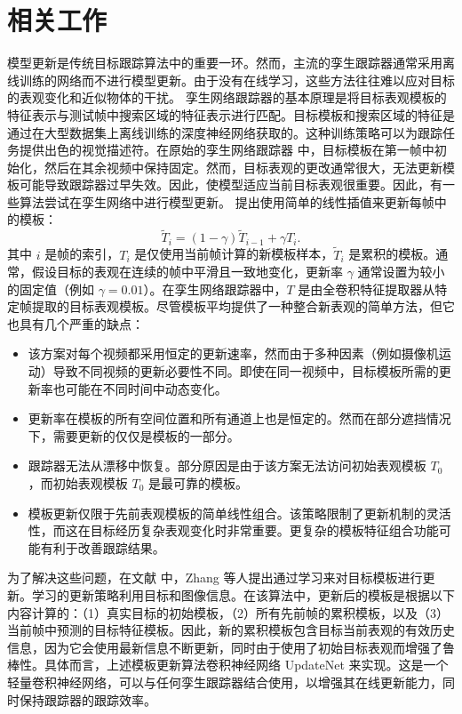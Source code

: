 \section{相关工作}
模型更新是传统目标跟踪算法中的重要一环。然而，主流的孪生跟踪器通常采用离线训练的网络而不进行模型更新。由于没有在线学习，这些方法往往难以应对目标的表观变化和近似物体的干扰。
孪生网络跟踪器的基本原理是将目标表观模板的特征表示与测试帧中搜索区域的特征表示进行匹配。目标模板和搜索区域的特征是通过在大型数据集上离线训练的深度神经网络获取的。这种训练策略可以为跟踪任务提供出色的视觉描述符。在原始的孪生网络跟踪器 \cite{SiamFC} 中，目标模板在第一帧中初始化，然后在其余视频中保持固定。然而，目标表观的更改通常很大，无法更新模板可能导致跟踪器过早失效。因此，使模型适应当前目标表观很重要。因此，有一些算法尝试在孪生网络中进行模型更新。\cite{zhu2018distractor} 提出使用简单的线性插值来更新每帧中的模板：
\begin{equation}
\widetilde{T}_{i}=(1-\gamma) \widetilde{T}_{i-1}+\gamma T_{i}.
\end{equation}
其中 $i$ 是帧的索引，$T_{i}$ 是仅使用当前帧计算的新模板样本，$\widetilde{T}_{i}$ 是累积的模板。通常，假设目标的表观在连续的帧中平滑且一致地变化，更新率 $\gamma$ 通常设置为较小的固定值（例如 $\gamma = 0.01$）。在孪生网络跟踪器中，$T$ 是由全卷积特征提取器从特定帧提取的目标表观模板。尽管模板平均提供了一种整合新表观的简单方法，但它也具有几个严重的缺点：
\begin{itemize}
\item 该方案对每个视频都采用恒定的更新速率，然而由于多种因素（例如摄像机运动）导致不同视频的更新必要性不同。即使在同一视频中，目标模板所需的更新率也可能在不同时间中动态变化。
\item 更新率在模板的所有空间位置和所有通道上也是恒定的。然而在部分遮挡情况下，需要更新的仅仅是模板的一部分。
\item 跟踪器无法从漂移中恢复。部分原因是由于该方案无法访问初始表观模板 $T_{0}$，而初始表观模板 $T_{0}$ 是最可靠的模板。
\item 模板更新仅限于先前表观模板的简单线性组合。该策略限制了更新机制的灵活性，而这在目标经历复杂表观变化时非常重要。更复杂的模板特征组合功能可能有利于改善跟踪结果。
\end{itemize}
为了解决这些问题，在文献 \cite{Zhang_2019_ICCV} 中，Zhang 等人提出通过学习来对目标模板进行更新。学习的更新策略利用目标和图像信息。在该算法中，更新后的模板是根据以下内容计算的：（1）真实目标的初始模板，（2）所有先前帧的累积模板，以及（3）当前帧中预测的目标特征模板。因此，新的累积模板包含目标当前表观的有效历史信息，因为它会使用最新信息不断更新，同时由于使用了初始目标表观而增强了鲁棒性。具体而言，上述模板更新算法卷积神经网络 UpdateNet 来实现。这是一个轻量卷积神经网络，可以与任何孪生跟踪器结合使用，以增强其在线更新能力，同时保持跟踪器的跟踪效率。
